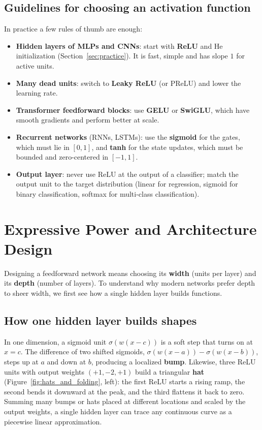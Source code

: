 \subsection{Guidelines for choosing an activation function}
In practice a few rules of thumb are enough:
\begin{itemize}
    \item \textbf{Hidden layers of MLPs and CNNs}: start with \textbf{ReLU} and He
          initialization (Section~\ref{sec:practice}). It is fast, simple and has
          slope $1$ for active units.
    \item \textbf{Many dead units}: switch to \textbf{Leaky ReLU} (or PReLU) and
          lower the learning rate.
    \item \textbf{Transformer feedforward blocks}: use \textbf{GELU} or
          \textbf{SwiGLU}, which have smooth gradients and perform better at scale.
    \item \textbf{Recurrent networks} (RNNs, LSTMs): use the \textbf{sigmoid} for the
          gates, which must lie in $[0,1]$, and \textbf{tanh} for the state updates,
          which must be bounded and zero-centered in $[-1,1]$.
    \item \textbf{Output layer}: never use ReLU at the output of a classifier;
          match the output unit to the target distribution (linear for regression,
          sigmoid for binary classification, softmax for multi-class
          classification).
\end{itemize}

\section{Expressive Power and Architecture Design}
\label{sec:expressive}
Designing a feedforward network means choosing its \textbf{width} (units per
layer) and its \textbf{depth} (number of layers). To understand why modern
networks prefer depth to sheer width, we first see how a single hidden layer
builds functions.

\subsection{How one hidden layer builds shapes}
In one dimension, a sigmoid unit $\sigma(w(x - c))$ is a soft step that turns on at
$x = c$. The difference of two shifted sigmoids, $\sigma(w(x - a)) - \sigma(w(x - b))$,
steps up at $a$ and down at $b$, producing a localized \textbf{bump}. Likewise,
three ReLU units with output weights $(+1, -2, +1)$ build a triangular \textbf{hat}
(Figure~\ref{fig:hats_and_folding}, left): the first ReLU starts a rising ramp, the
second bends it downward at the peak, and the third flattens it back to zero.
Summing many bumps or hats placed at different locations and scaled by the output
weights, a single hidden layer can trace any continuous curve as a piecewise linear
approximation.

